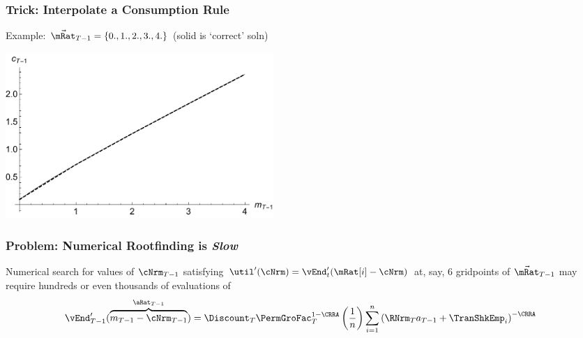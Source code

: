 \documentclass{beamer}
\begin{document}
\begin{frame}[label=DiscretizeEqn]
\frametitle{Trick: Interpolate a Consumption Rule}

Example: $\vec{\mRat}_{T-1} = \{0.,1.,2.,3.,4.\}$ (solid is `correct' soln)

\includegraphics[width=4.0in]{./Figures/PlotcTm1Simple.pdf}

\end{frame}

\begin{frame}[label=vEndtSlow]
\frametitle{Problem: Numerical Rootfinding is {\it Slow}}

Numerical search for values of $\cNrm_{T-1}$ satisfying
$\util^{\prime}(\cNrm) = \vEnd^{\prime}_{t}(\mRat[i]-\cNrm)$ at, say,
6 gridpoints of $\vec{\mRat}_{T-1}$ may require hundreds or even thousands of
evaluations of
\begin{equation}\begin{gathered}\begin{aligned}
        \vEnd^{\prime}_{T-1}(\overbrace{{m}_{T-1}-{\cNrm}_{T-1}}^{\aRat_{T-1}})  & =   \Discount_{T} \PermGroFac_{T}^{1-\CRRA}\left(\frac{1}{n}\right)\sum_{i=1}^{n}   \left( \RNrm_{T} {a}_{T-1} + \TranShkEmp_{i}\right)^{-\CRRA} \notag
\end{aligned}\end{gathered}\end{equation}

\end{frame}
\end{document}
